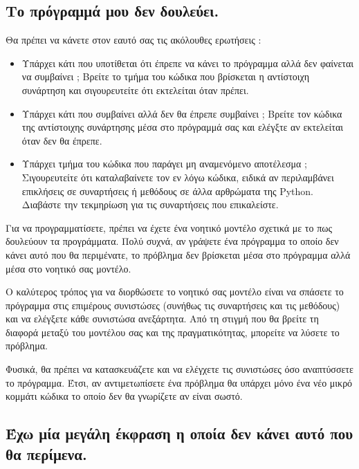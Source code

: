 \documentclass[10pt]{book}
\begin{document}
\subsection{Το πρόγραμμά μου δεν δουλεύει.}

Θα πρέπει να κάνετε στον εαυτό σας τις ακόλουθες ερωτήσεις : 

\begin{itemize}

\item Υπάρχει κάτι που υποτίθεται ότι έπρεπε να κάνει το πρόγραμμα αλλά δεν φαίνεται να συμβαίνει ;   Βρείτε το τμήμα του κώδικα που βρίσκεται η αντίστοιχη συνάρτηση και σιγουρευτείτε ότι εκτελείται όταν πρέπει.

\item Υπάρχει κάτι που συμβαίνει αλλά δεν θα έπρεπε συμβαίνει ;   Βρείτε τον 
κώδικα της αντίστοιχης συνάρτησης μέσα στο πρόγραμμά σας και ελέγξτε αν εκτελείται όταν δεν θα έπρεπε.

\item Υπάρχει τμήμα του κώδικα που παράγει μη αναμενόμενο αποτέλεσμα ;   Σιγουρευτείτε ότι καταλαβαίνετε τον εν λόγω κώδικα, ειδικά αν περιλαμβάνει επικλήσεις σε συναρτήσεις ή μεθόδους σε άλλα αρθρώματα της  Python.   Διαβάστε την τεκμηρίωση για τις συναρτήσεις που επικαλείστε.

\end{itemize}

Για να προγραμματίσετε, πρέπει να έχετε ένα νοητικό μοντέλο σχετικά με το πως δουλεύουν τα προγράμματα.  Πολύ συχνά, αν γράψετε ένα πρόγραμμα το οποίο δεν 
κάνει αυτό που θα περιμένατε, το πρόβλημα δεν βρίσκεται μέσα στο πρόγραμμα αλλά 
μέσα στο νοητικό σας μοντέλο.

Ο καλύτερος τρόπος για να διορθώσετε το νοητικό σας μοντέλο είναι να σπάσετε το πρόγραμμα στις επιμέρους συνιστώσες (συνήθως τις συναρτήσεις και τις μεθόδους) και 
να ελέγξετε κάθε συνιστώσα ανεξάρτητα.  Από τη στιγμή που θα βρείτε τη διαφορά μεταξύ του μοντέλου σας και της πραγματικότητας, μπορείτε να λύσετε το πρόβλημα.

Φυσικά, θα πρέπει να κατασκευάζετε και να ελέγχετε τις συνιστώσες όσο αναπτύσσετε το πρόγραμμα.  Έτσι, αν αντιμετωπίσετε ένα πρόβλημα θα υπάρχει μόνο ένα νέο μικρό κομμάτι κώδικα το οποίο δεν θα γνωρίζετε αν είναι σωστό.



\subsection{Έχω μία μεγάλη έκφραση η οποία δεν κάνει αυτό που θα περίμενα.}
\end{document}
